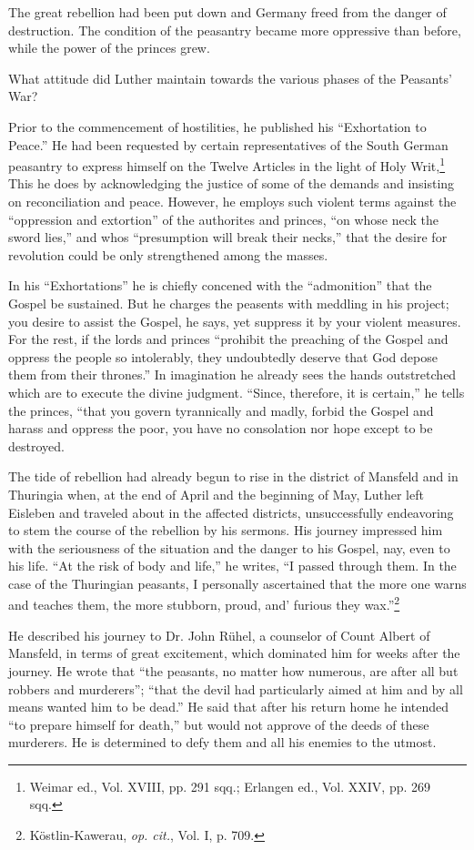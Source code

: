 The great rebellion had been put down and Germany freed from
the danger of destruction. The condition of the peasantry became
more oppressive than before, while the power of the princes grew.

What attitude did Luther maintain towards the various phases of
the Peasants’ War?

Prior to the commencement of hostilities, he published his ``Exhortation
to Peace.'' He had been requested by certain representatives
of the South German peasantry to express himself on the Twelve
Articles in the light of Holy Writ,\footnote
{Weimar ed., Vol. XVIII, pp. 291 sqq.; Erlangen ed., Vol. XXIV, pp. 269 sqq.}
This he does by acknowledging
the justice of some of the demands and insisting on reconciliation and
peace. However, he employs such violent terms against the ``oppression
and extortion'' of the authorites and princes, ``on whose neck
the sword lies,'' and whos ``presumption will break their necks,''
that the desire for revolution could be only strengthened among the
masses.

In his “Exhortations” he is chiefly concened with the ``admonition'' that
the Gospel be sustained. But he charges the peasents with meddling in his
project; you desire to assist the Gospel, he says, yet suppress it by your violent
measures. For the rest, if the lords and princes “prohibit the preaching of
the Gospel and oppress the people so intolerably, they undoubtedly deserve
that God depose them from their thrones.” In imagination he already sees
the hands outstretched which are to execute the divine judgment. “Since,
therefore, it is certain,” he tells the princes, “that you govern tyrannically
and madly, forbid the Gospel and harass and oppress the poor, you have no
consolation nor hope except to be destroyed.

The tide of rebellion had already begun to rise in the district of
Mansfeld and in Thuringia when, at the end of April and the beginning
of May, Luther left Eisleben and traveled about in the affected
districts, unsuccessfully endeavoring to stem the course of the rebellion
by his sermons. His journey impressed him with the seriousness
of the situation and the danger to his Gospel, nay, even to his life.
“At the risk of body and life,” he writes, “I passed through them. In
the case of the Thuringian peasants, I personally ascertained that the more
one warns and teaches them, the more stubborn, proud, and' furious they
wax.”\footnote{Köstlin-Kawerau, \textit{op. cit.}, Vol. I, p. 709.}

He described his journey to Dr. John Rühel, a counselor of Count Albert
of Mansfeld, in terms of great excitement, which dominated him for weeks
after the journey. He wrote that “the peasants, no matter how numerous,
are after all but robbers and murderers”; “that the devil had particularly
aimed at him and by all means wanted him to be dead.” He said that after
his return home he intended “to prepare himself for death,” but would not
approve of the deeds of these murderers. He is determined to defy them and
all his enemies to the utmost.


